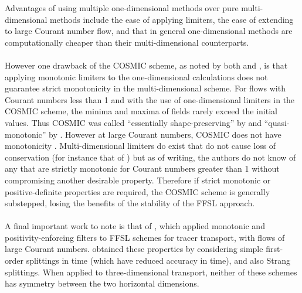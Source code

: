 \documentclass[11pt,a4paper]{article}
\begin{document}
Advantages of using multiple one-dimensional methods over pure multi-dimensional methods include the ease of applying limiters, the ease of extending to large Courant number flow, and that in general one-dimensional methods are computationally cheaper than their multi-dimensional counterparts. \\
\\
However one drawback of the COSMIC scheme, as noted by both \citet{lin1996ffsl} and \citet{leonard1996cosmic},  is that applying monotonic limiters to the one-dimensional calculations does not guarantee strict monotonicity in the multi-dimensional scheme.
For flows with Courant numbers less than 1 and with the use of one-dimensional limiters in the COSMIC scheme, the minima and maxima of fields rarely exceed the initial values.
Thus COSMIC was called ``essentially shape-preserving'' by \citet{leonard1996cosmic} and ``quasi-monotonic'' by \citet{putman2007fvtransport}.
However at large Courant numbers, COSMIC does not have monotonicity \citep{leonard1996cosmic,bott2010improving}.
Multi-dimensional limiters do exist that do not cause loss of conservation (for instance that of \citet{thuburn1996multidimensional}) but as of writing, the authors do not know of any that are strictly monotonic for Courant numbers greater than 1 without compromising another desirable property.
Therefore if strict monotonic or positive-definite properties are required, the COSMIC scheme is generally substepped, losing the benefits of the stability of the FFSL approach. \\
\\
A final important work to note is that of \citet{skamarock2006limiters}, which applied monotonic and positivity-enforcing filters to FFSL schemes for tracer transport, with flows of large Courant numbers.
\citet{skamarock2006limiters} obtained these properties by considering simple first-order splittings in time (which have reduced accuracy in time), and also Strang splittings.
When applied to three-dimensional transport, neither of these schemes has symmetry between the two horizontal dimensions.
 
\end{document}
